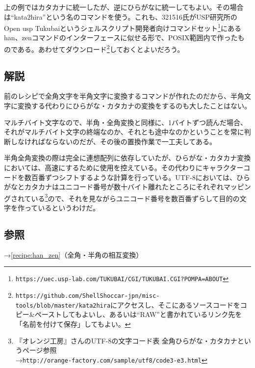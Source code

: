 上の例ではカタカナに統一したが、逆にひらがなに統一してもよい。その場合は``kata2hira''という名のコマンドを使う。これも、321516氏がUSP研究所のOpen usp Tukubaiというシェルスクリプト開発者向けコマンドセット\footnote{\verb|https://uec.usp-lab.com/TUKUBAI/CGI/TUKUBAI.CGI?POMPA=ABOUT|}にあるhan、zenコマンドのインターフェースに似せる形で、POSIX範囲内で作ったものである。あわせてダウンロード\footnote{\verb|https://github.com/ShellShoccar-jpn/misc-tools/blob/master/kata2hira|にアクセスし、そこにあるソースコードをコピー\&{}ペーストしてもよいし、あるいは``RAW''と書かれているリンク先を「名前を付けて保存」してもよい。}しておくとよいだろう。

\subsection*{解説}

前のレシピで全角文字を半角文字に変換するコマンドが作れたのだから、半角文字に変換する代わりにひらがな・カタカナの変換をするのも大したことはない。

マルチバイト文字なので、半角・全角変換と同様に、1バイトずつ読んだ場合、それがマルチバイト文字の終端なのか、それとも途中なのかということを常に判断しなければならないのだが、その後の置換作業で一工夫してある。

半角全角変換の際は完全に連想配列に依存していたが、ひらがな・カタカナ変換においては、高速にするために使用を控えている。その代わりにキャラクターコードを数百番ずつシフトするような計算を行っている。UTF-8においては、ひらがなとカタカナはユニコード番号が数十バイト離れたところにそれぞれマッピングされている\footnote{『オレンジ工房』さんのUTF-8の文字コード表 全角ひらがな・カタカナというページ参照 \\ →\verb|http://orange-factory.com/sample/utf8/code3-e3.html|}ので、それを見ながらユニコード番号を数百番ずらして目的の文字を作っているというわけだ。

\subsection*{参照}

\noindent
→\ref{recipe:han_zen}（全角・半角の相互変換）
